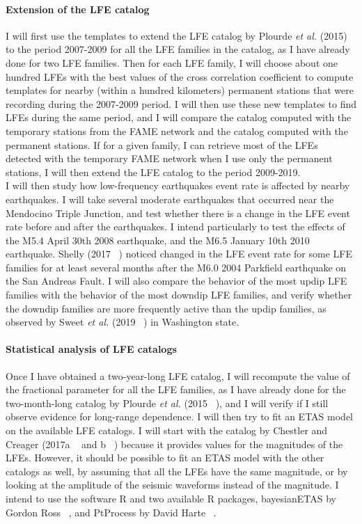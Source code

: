 \documentclass[letterpaper, 12pt]{article}
\begin{document}
\paragraph{Extension of the LFE catalog} I will first use the templates to extend the LFE catalog by Plourde \textit{et al.} (2015) to the period 2007-2009 for all the LFE families in the catalog, as I have already done for two LFE families. Then for each LFE family, I will choose about one hundred LFEs with the best values of the cross correlation coefficient to compute templates for nearby (within a hundred kilometers) permanent stations that were recording during the 2007-2009 period. I will then use these new templates to find LFEs during the same period, and I will compare the catalog computed with the temporary stations from the FAME network and the catalog computed with the permanent stations. If for a given family, I can retrieve most of the LFEs detected with the temporary FAME network when I use only the permanent stations, I will then extend the LFE catalog to the period 2009-2019. \\

I will then study how low-frequency earthquakes event rate is affected by nearby earthquakes. I will take several moderate earthquakes that occurred near the Mendocino Triple Junction, and test whether there is a change in the LFE event rate before and after the earthquakes. I intend particularly to test the effects of the M5.4 April 30th 2008 earthquake, and the M6.5 January 10th 2010 earthquake. Shelly (2017 ~\cite{SHE_2017}) noticed changed in the LFE event rate for some LFE families for at least several months after the M6.0 2004 Parkfield earthquake on the San Andreas Fault. I will also compare the behavior of the most updip LFE families with the behavior of the most downdip LFE families, and verify whether the downdip families are more frequently active than the updip families, as observed by Sweet \textit{et al.} (2019 ~\cite{SWE_2019}) in Washington state.

\paragraph{Statistical analysis of LFE catalogs} Once I have obtained a two-year-long LFE catalog, I will recompute the value of the fractional parameter for all the LFE families, as I have already done for the two-month-long catalog by Plourde \textit{et al.} (2015 ~\cite{PLO_2015}), and I will verify if I still observe evidence for long-range dependence. I will then try to fit an ETAS model on the available LFE catalogs. I will start with the catalog by Chestler and Creager (2017a ~\cite{CHE_2017_JGR} and b ~\cite{CHE_2017_G3}) because it provides values for the magnitudes of the LFEs. However, it should be possible to fit an ETAS model with the other catalogs as well, by assuming that all the LFEs have the same magnitude, or by looking at the amplitude of the seismic waveforms instead of the magnitude. I intend to use the software R and two available R packages, bayesianETAS by Gordon Ross ~\cite{ROS_2016}, and PtProcess by David Harte ~\cite{HAR_2010}.
\end{document}
